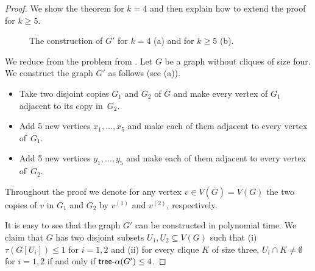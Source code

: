 \documentclass[11pt]{article}
\theoremstyle{definition}
\newcommand{\tin}{\mathsf{tree} \textnormal{-} \alpha}
\begin{document}
\begin{proof}
We show the theorem for $k=4$ and then explain how to extend the proof for $k\geq 5$.


\begin{figure}[ht]
\centering
\scalebox{0.7}{

}
\caption{The construction of $G'$ for $k=4$ (a) and for $k\geq 5$ (b).}\label{fig:GNPc}
\end{figure}

We reduce from the problem from .
Let $G$ be a graph without cliques of size four. We construct the graph $G'$ as follows (see  (a)).
\begin{itemize}
\item Take two disjoint copies $G_1$ and $G_2$ of $\overline{G}$ and make every vertex of $G_1$ adjacent to its copy in~$G_2$.
\item Add 5 new vertices $x_1,\ldots,x_5$ and make each of them adjacent to every vertex of~$G_1$.
 \item Add 5 new vertices $y_1,\ldots,y_5$ and make each of them adjacent to every vertex of~$G_2$.
\end{itemize}
Throughout the proof we denote for any vertex $v\in V(\overline{G}) = V(G)$ the two copies of $v$ in $G_1$ and $G_2$ by $v^{(1)}$ and $v^{(2)}$, respectively.

It is easy to see that the graph $G'$ can be constructed in polynomial time.
We claim that $G$ has two disjoint subsets $U_1,U_2\subseteq V(G)$ such that  (i) $\tau(G[U_i])\leq 1$ for $i=1,2$
and (ii) for every clique $K$ of size three, $U_i\cap K\neq \emptyset$ for $i=1,2$ if and only if $\tin(G')\leq 4$.


\end{proof}
\end{document}
